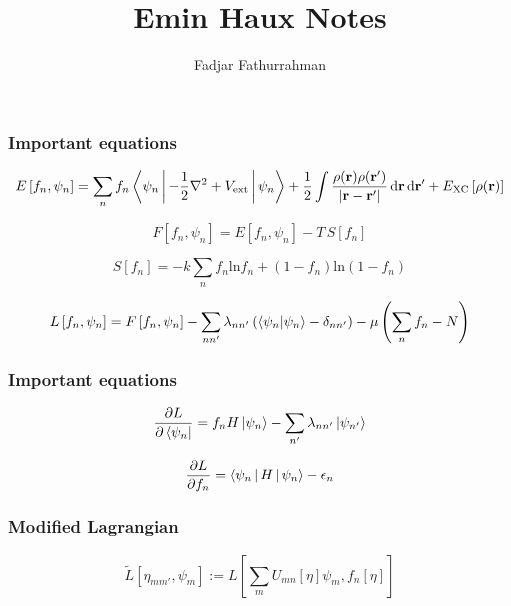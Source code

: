 \documentclass[english,9pt]{beamer}
\begin{document}
\title{Emin Haux Notes}
\author{Fadjar Fathurrahman}
\date{}

\frame{\titlepage}

\begin{frame}
\frametitle{Important equations}

\begin{equation}
E\left[f_{n}, \psi_{n} \right] = \sum_{n} f_{n}
\Braket{\psi_{n} | -\frac{1}{2}\nabla^2 + V_{\mathrm{ext}} | \psi_{n} } +
\frac{1}{2}\int \frac{\rho(\mathbf{r}) \rho(\mathbf{r}') }{\left| \mathbf{r} - \mathbf{r}' \right|}
\, \mathrm{d}\mathbf{r} \, \mathrm{d}\mathbf{r}' +
E_{\mathrm{XC}}\left[\rho(\mathbf{r})\right]
\end{equation}

\begin{equation}
F\left[f_{n},\psi_{n}\right] = E\left[f_{n},\psi_{n}\right] - T\,S\left[f_{n}\right]
\end{equation}

\begin{equation}
S\left[f_{n}\right] = -k\sum_{n} f_{n} \mathrm{ln} f_{n} +
(1 - f_{n}) \mathrm{ln}\left(1 - f_{n} \right)
\end{equation}

\begin{equation}
L\left[ f_{n}, \psi_{n} \right] = F\left[ f_{n}, \psi_{n} \right] -
\sum_{nn'} \lambda_{nn'} \left( \braket{ \psi_{n} | \psi_{n}} - \delta_{nn'} \right) -
\mu\left( \sum_{n} f_{n} -N \right)
\end{equation}

\end{frame}


\begin{frame}
\frametitle{Important equations}

\begin{equation}
\frac{\partial L}{\partial \Bra{\psi_{n}}} = f_{n} H \Ket{\psi_{n}}
- \sum_{n'} \lambda_{nn'} \ket{\psi_{n'}}
\end{equation}

\begin{equation}
\frac{\partial L}{\partial f_{n}} = \Braket{\psi_{n} | H | \psi_{n} } - \epsilon_{n}
\end{equation}

\end{frame}


\begin{frame}
\frametitle{Modified Lagrangian}

\begin{equation}
\tilde{L} \left[ \eta_{mm'}, \psi_{m}\right ] :=
L\left[
\sum_{m} U_{mn} \left[\eta\right] \psi_{m}, f_{n}\left[\eta\right]
\right]
\end{equation}

\end{frame}
\end{document}
